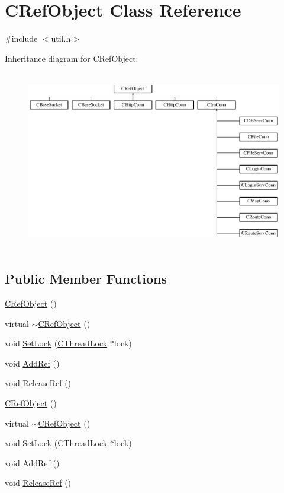 \hypertarget{class_c_ref_object}{}\section{C\+Ref\+Object Class Reference}
\label{class_c_ref_object}


{\ttfamily \#include $<$util.\+h$>$}

Inheritance diagram for C\+Ref\+Object\+:\begin{figure}[H]
\begin{center}
\leavevmode
\includegraphics[height=7.909604cm]{class_c_ref_object}
\end{center}
\end{figure}
\subsection*{Public Member Functions}
\begin{DoxyCompactItemize}
\item 
\hyperlink{class_c_ref_object_a38ca3e0f3605a6445fb87d2c3b83e212}{C\+Ref\+Object} ()
\item 
virtual \hyperlink{class_c_ref_object_a06e3321dcdefa9ed0d59612ae4eed06b}{$\sim$\+C\+Ref\+Object} ()
\item 
void \hyperlink{class_c_ref_object_a3fcf827f33d9daab3b55faac8b3331e4}{Set\+Lock} (\hyperlink{class_c_thread_lock}{C\+Thread\+Lock} $\ast$lock)
\item 
void \hyperlink{class_c_ref_object_aff5d1f837b981a84e45e7bc519399e1b}{Add\+Ref} ()
\item 
void \hyperlink{class_c_ref_object_ac67482ec6248b9c050e753c4a8276aa6}{Release\+Ref} ()
\item 
\hyperlink{class_c_ref_object_a38ca3e0f3605a6445fb87d2c3b83e212}{C\+Ref\+Object} ()
\item 
virtual \hyperlink{class_c_ref_object_ad19e10a3762f12d2b072e408658809d3}{$\sim$\+C\+Ref\+Object} ()
\item 
void \hyperlink{class_c_ref_object_a3fcf827f33d9daab3b55faac8b3331e4}{Set\+Lock} (\hyperlink{class_c_thread_lock}{C\+Thread\+Lock} $\ast$lock)
\item 
void \hyperlink{class_c_ref_object_aff5d1f837b981a84e45e7bc519399e1b}{Add\+Ref} ()
\item 
void \hyperlink{class_c_ref_object_ac67482ec6248b9c050e753c4a8276aa6}{Release\+Ref} ()
\end{DoxyCompactItemize}
